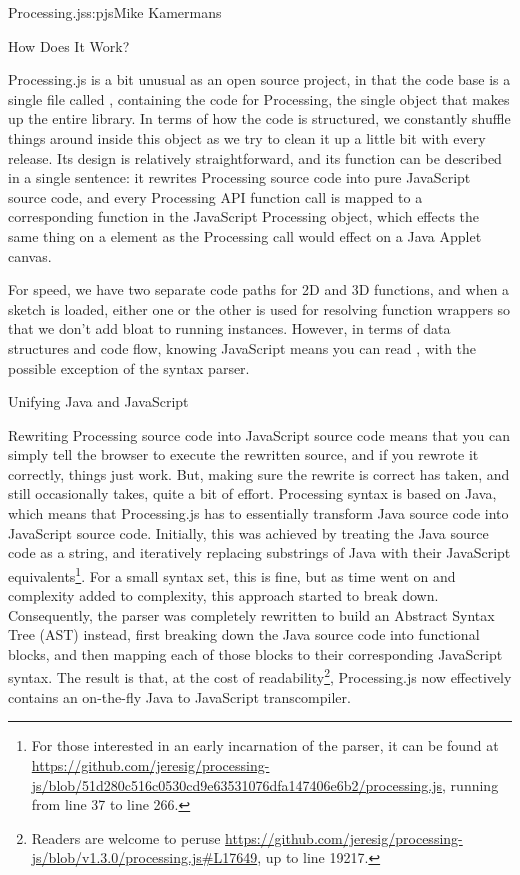 \begin{aosachapter}{Processing.js}{s:pjs}{Mike Kamermans}
\begin{aosasect1}{How Does It Work?}

Processing.js is a bit unusual as an open source project, in that the
code base is a single file called ,
containing the code for Processing, the single object that makes up
the entire library. In terms of how the code is structured, we
constantly shuffle things around inside this object as we try to clean
it up a little bit with every release. Its design is relatively
straightforward, and its function can be described in a single
sentence: it rewrites Processing source code into pure JavaScript
source code, and every Processing API function call is mapped to a
corresponding function in the JavaScript Processing object, which
effects the same thing on a 
element as the Processing call would effect on a Java Applet canvas.

For speed, we have two separate code paths for 2D and 3D functions,
and when a sketch is loaded, either one or the other is used for
resolving function wrappers so that we don't add bloat to running
instances. However, in terms of data structures and code flow, knowing
JavaScript means you can read , with the possible
exception of the syntax parser.

\begin{aosasect2}{Unifying Java and JavaScript}

Rewriting Processing source code into JavaScript source code means
that you can simply tell the browser to execute the rewritten source,
and if you rewrote it correctly, things just work. But, making sure
the rewrite is correct has taken, and still occasionally takes, quite
a bit of effort. Processing syntax is based on Java, which means that
Processing.js has to essentially transform Java source code into
JavaScript source code. Initially, this was achieved by treating the
Java source code as a string, and iteratively replacing substrings of
Java with their JavaScript equivalents\footnote{For those interested
  in an early incarnation of the parser, it can be found at
  \url{https://github.com/jeresig/processing-js/blob/51d280c516c0530cd9e63531076dfa147406e6b2/processing.js},
  running from line 37 to line 266.}. For a small syntax set, this is
fine, but as time went on and complexity added to complexity, this
approach started to break down. Consequently, the parser was
completely rewritten to build an Abstract Syntax Tree (AST) instead, first
breaking down the Java source code into functional blocks, and then
mapping each of those blocks to their corresponding JavaScript
syntax. The result is that, at the cost of
readability\footnote{Readers are welcome to peruse
  \url{https://github.com/jeresig/processing-js/blob/v1.3.0/processing.js\#L17649},
  up to line 19217.}, Processing.js now effectively contains an
on-the-fly Java to JavaScript transcompiler.


\end{aosasect2}
\end{aosasect1}
\end{aosachapter}
